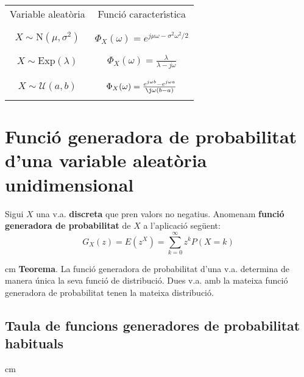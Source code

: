 \documentclass{article}
\begin{document}
\begin{center}
\begin{tabular}{|c|c|}
\hline
Variable aleat\`oria & Funci\'o caracter\'\i stica  \\ &  \\ \hline  & \\
$X \sim \mathrm{N}(\mu, \sigma^2)$ & $\Phi_X(\omega)=e^{j\mu\omega-\sigma^2\omega^2/2}$ \\  & \\ \hline  &\\ 
$X \sim \mathrm{Exp}(\lambda)$ & $\Phi_X(\omega)=\frac{\lambda}{\lambda - j \omega}$ \\  & \\ \hline  &\\ 
$X \sim \mathcal{U}(a, b)$ & $\Phi_X(\omega)=\frac{e^{j\omega b} - e^{j\omega a}}{\j\omega (b-a)}$ \\  & \\
\hline
\end{tabular}
\end{center}



\section*{Funci\'o generadora de probabilitat d'una variable aleat\`oria unidimensional}

Sigui $X$ una v.a. {\bf discreta} que pren valors no negatius. 
Anomenam {\bf funci\'o generadora de probabilitat} de $X$ a l'aplicaci\'o seg\"uent:
\[
G_X(z)=E(z^X)=\sum_{k=0}^\infty z^k P(X=k)
\]

 cm
\noindent
{\bf Teorema}. La funci\'o generadora de probabilitat d'una v.a. determina de manera \'unica
la seva funci\'o de distribuci\'o. Dues v.a. amb la mateixa funci\'o generadora de probabilitat
tenen la mateixa distribuci\'o. 


\subsection*{Taula de funcions generadores de probabilitat habituals}

 cm
\end{document}
